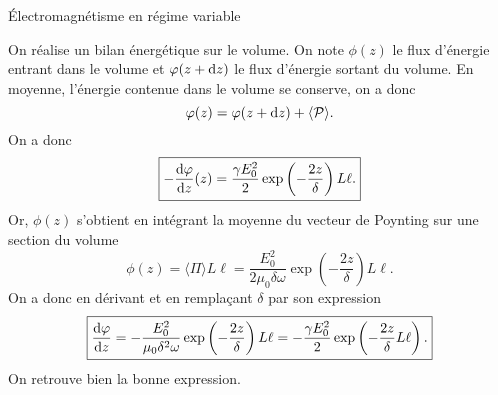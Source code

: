 \begin{corr}{Électromagnétisme en régime variable}
\begin{corrlist}
	\item On réalise un bilan énergétique sur le volume. On note $\phi(z)$
	      le flux d'énergie entrant dans le volume et $\varphi(z + \mathrm{d}z)$ le
	      flux d'énergie sortant du volume. En moyenne, l'énergie contenue
	      dans le volume se conserve, on a donc
	      \begin{equation*}
		      \varphi(z) = \varphi(z + \mathrm{d}z) + \langle \mathcal{P} \rangle.
	      \end{equation*}
	      On a donc
	      \begin{equation*}
		      \boxed{
		      -\dfrac{\mathrm{d} \varphi}{\mathrm{d} z}(z) = \dfrac{\gamma E_0^2}{2} 
		      \exp\left(-\dfrac{2z}{\delta}\right) L \ell.
	      }
      	      \end{equation*}
	      Or, $\phi(z)$ s'obtient en intégrant la moyenne du vecteur de 
	      Poynting sur une section du volume
	      \begin{equation*}
		      \phi(z) = \langle \Pi \rangle L \ell = 
		      	   \dfrac{E_0^2}{2 \mu_0 \delta \omega} \exp\left(
			    - \dfrac{2z}{\delta}\right) L \ell.
	      \end{equation*}
	      On a donc en dérivant et en remplaçant $\delta$ par son expression
	      \begin{equation*}
		      \boxed{
		      \dfrac{\mathrm{d} \varphi}{\mathrm{d} z} = -\dfrac{E_0^2}{\mu_0 \delta^2 \omega}
		      \exp\left(-\dfrac{2z}{\delta}\right)L \ell=
		      - \dfrac{\gamma E_0^2}{2} \exp\left(-\dfrac{2z}{\delta} L \ell
			      \right).
		      }
	     \end{equation*}
	     On retrouve bien la bonne expression.
\end{corrlist}
\end{corr}
